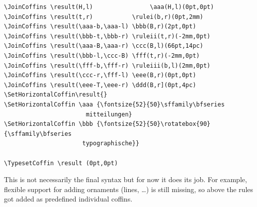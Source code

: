 \documentclass{article}
\begin{document}
\begin{center}
\begin{minipage}{14cm}
\begin{verbatim}
\JoinCoffins \result(H,l)                \aaa(H,l)(0pt,0pt) 
\JoinCoffins \result(t,r)           \rulei(b,r)(0pt,2mm)
\JoinCoffins \result(\aaa-b,\aaa-l) \bbb(B,r)(2pt,0pt)
\JoinCoffins \result(\bbb-t,\bbb-r) \ruleii(t,r)(-2mm,0pt)
\JoinCoffins \result(\aaa-B,\aaa-r) \ccc(B,l)(66pt,14pc)
\JoinCoffins \result(\bbb-l,\ccc-B) \fff(t,r)(-2mm,0pt)
\JoinCoffins \result(\fff-b,\fff-r) \ruleiii(b,l)(2mm,0pt)
\JoinCoffins \result(\ccc-r,\fff-l) \eee(B,r)(0pt,0pt)
\JoinCoffins \result(\eee-T,\eee-r) \ddd(B,r](0pt,4pc)
\SetHorizontalCoffin\result{}
\SetHorizontalCoffin \aaa {\fontsize{52}{50}\sffamily\bfseries
                       mitteilungen}
\SetHorizontalCoffin \bbb {\fontsize{52}{50}\rotatebox{90}{\sffamily\bfseries 
                      typographische}}

\TypesetCoffin \result (0pt,0pt)
\end{verbatim}

This is not necessarily the final syntax but for now it does its job. For
example, flexible support for adding ornaments (lines, \ldots) is still
missing, so above the rules got added as predefined individual coffins.

\end{minipage}
\end{center}
\end{document}
